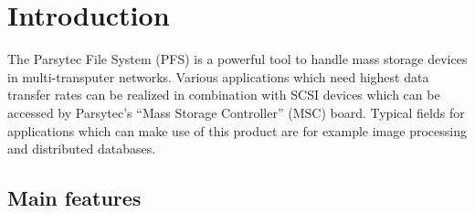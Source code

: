\chapter{Introduction}

The Parsytec File System (PFS) is a powerful tool to handle mass storage 
devices in multi-transputer networks. Various applications which need highest 
data transfer rates can be realized in combination with SCSI devices which can
be accessed by Parsytec's ``Mass Storage Controller'' (MSC) board. Typical 
fields for applications which can make use of this product are for example 
image processing and distributed databases.

\section{Main features}

